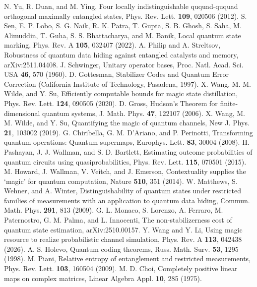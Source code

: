 \documentclass[aps,pra,twocolumn,floatfix,amsfonts,10pt]{revtex4-2}
\begin{document}
\begin{thebibliography}{}
	N. Yu, R. Duan, and M. Ying, Four locally indistinguishable ququad-ququad orthogonal maximally entangled states, Phys. Rev. Lett. \textbf{109}, 020506 (2012).
	S. Sen, E. P. Lobo, S. G. Naik, R. K. Patra, T. Gupta, S. B. Ghosh, S. Saha, M. Alimuddin, T. Guha, S. S. Bhattacharya, and M. Banik, Local quantum state marking, Phys. Rev. A \textbf{105}, 032407 (2022).
	A. Philip and A. Streltsov, Robustness of quantum data hiding against entangled catalysts and memory, arXiv:2511.04408.
	J. Schwinger, Unitary operator bases, Proc. Natl. Acad. Sci. USA \textbf{46}, 570 (1960).
	D. Gottesman, Stabilizer Codes and Quantum Error Correction (California Institute of Technology, Pasadena, 1997).
	X. Wang, M. M. Wilde, and Y. Su, Efficiently computable bounds for magic state distillation, Phys. Rev. Lett. \textbf{124}, 090505 (2020).
	D. Gross, Hudson’s Theorem for finite-dimensional quantum systems, J. Math. Phys. \textbf{47}, 122107 (2006).
	X. Wang, M. M. Wilde, and Y. Su, Quantifying the magic of quantum channels, New J. Phys. \textbf{21}, 103002 (2019).
	G. Chiribella, G. M. D'Ariano, and P. Perinotti, Transforming quantum operations: Quantum supermaps, Europhys. Lett. \textbf{83}, 30004 (2008).
	H. Pashayan, J. J. Wallman, and S. D. Bartlett, Estimating outcome probabilities of quantum circuits using quasiprobabilities, Phys. Rev. Lett. \textbf{115}, 070501 (2015).
	M. Howard, J. Wallman, V. Veitch, and J. Emerson, Contextuality supplies the ‘magic’ for quantum computation, Nature \textbf{510}, 351 (2014).
	W. Matthews, S. Wehner, and A. Winter, Distinguishability of quantum states under restricted families of measurements with an application to quantum data hiding, Commun. Math. Phys. \textbf{291}, 813 (2009).
	G. L. Monaco, S. Lorenzo, A. Ferraro, M. Paternostro, G. M. Palma, and L. Innocenti, The non-stabilizerness cost of quantum state estimation, arXiv:2510.00157.
	Y. Wang and Y. Li, Using magic resource to realize probabilistic channel simulation, Phys. Rev. A \textbf{113}, 042438 (2026).
	A. S. Holevo, Quantum coding theorems, Russ. Math. Surv. \textbf{53}, 1295 (1998). 
	M. Piani, Relative entropy of entanglement and restricted measurements, Phys. Rev. Lett. \textbf{103}, 160504 (2009).
	M. D. Choi, Completely positive linear maps on complex matrices, Linear Algebra Appl. \textbf{10}, 285 (1975). 

\end{thebibliography}
\end{document}
